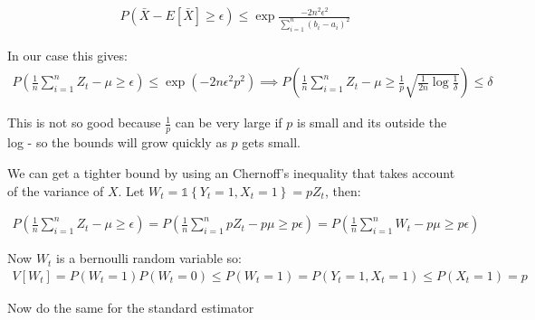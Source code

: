 \documentclass{article}
\newcommand{\set}[1]{\left\{#1\right\}}
\newcommand{\ind}[1]{\mathds{1}\!\!\set{#1}}
\newcommand{\eqn}[1]{\begin{align}#1\end{align}}
\theoremstyle{plain}
\theoremstyle{definition}
\begin{document}
\eqn {
P(\bar{X} - E[\bar{X}] \geq \epsilon) \leq \exp{\frac{-2n^2\epsilon^2}{\sum_{i=1}^n(b_i - a_i)^2}}
}

In our case this gives:
\eqn{
P(\frac{1}{n}\sum_{i=1}^n Z_t - \mu \geq \epsilon) \leq \exp{(-2n\epsilon^2p^2)} 
\implies P(\frac{1}{n}\sum_{i=1}^n Z_t - \mu \geq \frac{1}{p}\sqrt{\frac{1}{2n}\log{\frac{1}{\delta}}}) \leq \delta
}

This is not so good because $\frac{1}{p}$ can be very large if $p$ is small and its outside the log - so the bounds will grow quickly as $p$ gets small. 

We can get a tighter bound by using an Chernoff's inequality that takes account of the variance of $X$. Let $W_t = \ind{Y_t = 1,X_t=1} = pZ_t$, then:

\eqn{
P(\frac{1}{n}\sum_{i=1}^n Z_t - \mu \geq \epsilon) = P(\frac{1}{n}\sum_{i=1}^n pZ_t - p\mu \geq p\epsilon) = P(\frac{1}{n}\sum_{i=1}^n W_t - p\mu \geq p\epsilon)
}

Now $W_t$ is a bernoulli random variable so:
\eqn{
V[W_t] = P(W_t=1)P(W_t=0) \leq P(W_t=1) = P(Y_t=1,X_t=1) \leq P(X_t=1) = p
}



\color{red} Now do the same for the standard estimator \color{black}








\end{document}

